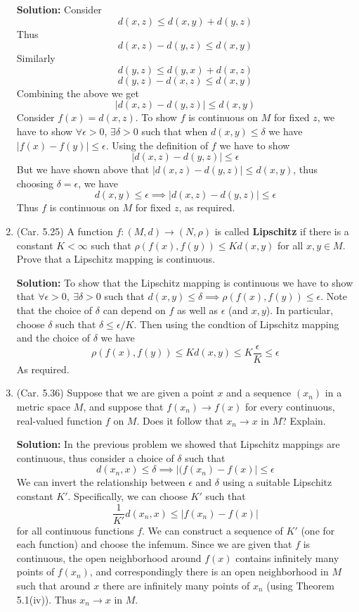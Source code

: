 \documentclass{article}
\def\le{\leqslant}
\def\to{\rightarrow}
\begin{document}
\begin{enumerate}
\textbf{Solution:} Consider 
\[
d(x,z) \le d(x,y) + d(y,z)
\]
Thus
\[
d(x,z)-d(y,z) \le d(x,y) 
\]
Similarly
\[
d(y,z) \le d(y,x) + d(x,z)
\]
\[
d(y,z) - d(x,z) \le d(x,y)
\]
Combining the above we get
\[
|d(x,z) - d(y,z)| \le d(x,y)
\]
Consider $f(x)=d(x,z)$. To show $f$ is continuous on $M$ for fixed $z$, we have to show $\forall \epsilon > 0$, 
$\exists \delta > 0$ such that when $d(x,y)\le\delta$ we have $|f(x)-f(y)|\le \epsilon$. 
Using the definition of $f$ we have to show
\[
|d(x,z)-d(y,z)| \le \epsilon
\]
But we have shown above that $|d(x,z)-d(y,z)| \le d(x,y)$, thus choosing $\delta = \epsilon$, we have
\[
d(x,y) \le \epsilon \implies |d(x,z)-d(y,z)| \le \epsilon
\]
Thus $f$ is continuous on $M$ for fixed $z$, as required.


\item (Car. 5.25) A function $f : (M, d) \to (N, \rho)$ is called \textbf{Lipschitz} if there is a constant $K < \infty$ such that $\rho(f(x), f(y)) \le Kd(x,y)$ for all $x,y \in M$. Prove that a Lipschitz mapping is continuous.

\textbf{Solution:} To show that the Lipschitz mapping is continuous we have to show that $\forall \epsilon > 0, \ 
\exists \delta > 0$ such that $d(x,y) \le \delta \implies \rho(f(x), f(y)) \le \epsilon$. Note that the choice of
$\delta$ can depend on $f$ as well as $\epsilon$ (and $x,y$). In particular, choose $\delta$ such that
$\delta \le \epsilon/K$.
Then using the condtion of Lipschitz mapping and the choice of $\delta$ we have
\[
\rho(f(x),f(y)) \le Kd(x,y) \le K\frac{\epsilon}{K} \le \epsilon
\]
As required.


\item (Car. 5.36) Suppose that we are given a point $x$ and a sequence $(x_n)$ in a metric space $M$, and suppose that $f(x_n) \to f(x)$ for every continuous, real-valued function $f$ on $M$. Does it follow that $x_n \to x$ in $M$? Explain.

\textbf{Solution:} In the previous problem we showed that Lipschitz mappings are continuous, thus consider a choice
of $\delta$ such that
\[
d(x_n,x) \le \delta \implies |(f(x_n)-f(x)| \le \epsilon
\]
We can invert the relationship between $\epsilon$ and $\delta$ using a suitable Lipschitz constant $K'$.
Specifically, we can choose $K'$ such that
\[
\frac{1}{K'}d(x_n,x) \le |f(x_n)-f(x)|
\] for all continuous functions $f$. We can construct a sequence of $K'$ (one for each function) and choose the
infemum.
Since we are given that $f$ is continuous, the open neighborhood around $f(x)$ contains infinitely many 
points of $f(x_n)$, and correspondingly there is an open neighborhood in $M$ such that around $x$ there
are infinitely many points of $x_n$ (using Theorem 5.1(iv)). Thus $x_n \to x$ in $M$.


\end{enumerate}
\end{document}
